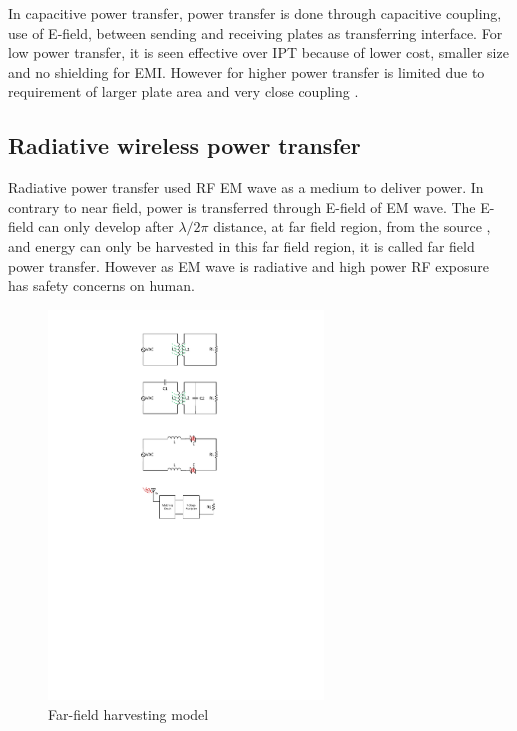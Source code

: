 \documentclass[UKenglish]{ifimaster}  %
\begin{document}
In capacitive power transfer, power transfer is done through capacitive coupling, use of E-field, between sending 
and receiving plates as transferring interface. For low power transfer, it is seen effective over IPT because of 
lower cost, smaller size and no shielding for EMI. However for higher power transfer is limited due to 
requirement of larger plate area and very close coupling \cite{wpt_cpt}. \\

\subsection{Radiative wireless power transfer}

Radiative power transfer used RF EM wave as a medium to deliver power. In contrary to near field, power is 
transferred through E-field of EM wave. The E-field can only develop after $\lambda /2\pi$ distance, at far 
field region, from the source \cite[pp. 112]{rfid_2010}, and energy can only be harvested in this far field 
region, it is called far field power transfer. However as EM wave is radiative and high power RF exposure has 
safety concerns on human. \\

\begin{figure}[htbp] %
   \centering
   \includegraphics[width=0.65\textwidth]{img/visio_rf.pdf}
   \caption{Far-field harvesting model}
   \label{fig:visio_model_far}
\end{figure}
\end{document}
